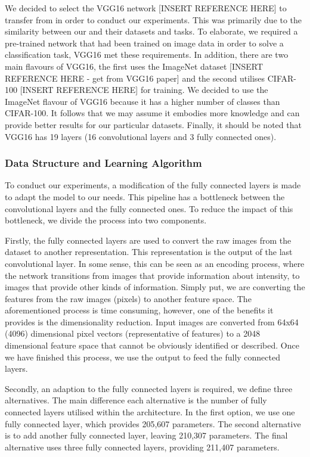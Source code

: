 \documentclass{article}
\begin{document}
We decided to select the VGG16 network [INSERT REFERENCE HERE] to transfer from in order to conduct our experiments. This was primarily due to the similarity between our and their datasets and tasks. To elaborate, we required a pre-trained network that had been trained on image data in order to solve a classification task, VGG16 met these requirements. In addition, there are two main flavours of VGG16, the first uses the ImageNet dataset [INSERT REFERENCE HERE - get from VGG16 paper] and the second utilises CIFAR-100 [INSERT REFERENCE HERE] for training. We decided to use the ImageNet flavour of VGG16 because it has a higher number of classes than CIFAR-100. It follows that we may assume it embodies more knowledge and can provide better results for our particular datasets. Finally, it should be noted that VGG16 has 19 layers (16 convolutional layers and 3 fully connected ones).

\subsubsection{\textbf{Data Structure and Learning Algorithm}}

To conduct our experiments, a modification of the fully connected layers is made to adapt the model to our needs. This pipeline has a bottleneck between the convolutional layers and the fully connected ones. To reduce the impact of this bottleneck, we divide the process into two components.

Firstly, the fully connected layers are used to convert the raw images from the dataset to another representation. This representation is the output of the last convolutional layer. In some sense, this can be seen as an encoding process, where the network transitions from images that provide information about intensity, to images that provide other kinds of information. Simply put, we are converting the features from the raw images (pixels) to another feature space. The aforementioned process is time consuming, however, one of the benefits it provides is the dimensionality reduction. Input images are converted from 64x64 (4096) dimensional pixel vectors (representative of features) to a 2048 dimensional feature space that cannot be obviously identified or described. Once we have finished this process, we use the output to feed the fully connected layers.

Secondly, an adaption to the fully connected layers is required, we define three alternatives. The main difference each alternative is the number of fully connected layers utilised within the architecture. In the first option, we use one fully connected layer, which provides 205,607 parameters. The second alternative is to add another fully connected layer, leaving 210,307 parameters. The final alternative uses three fully connected layers, providing 211,407 parameters.
\end{document}
